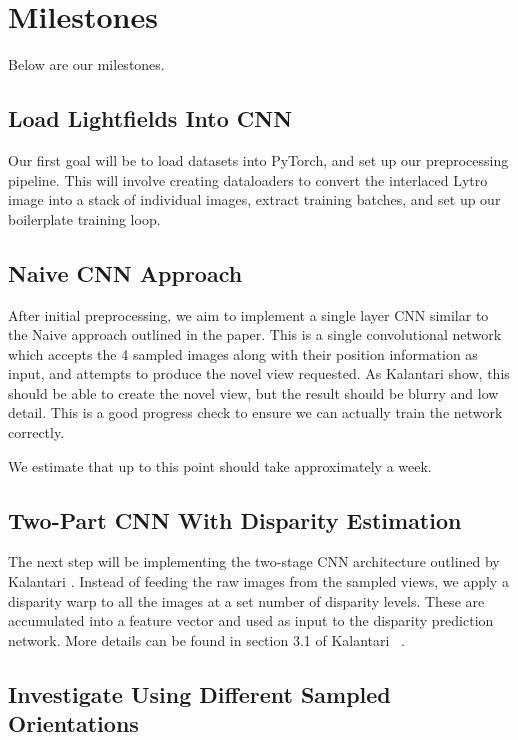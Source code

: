 \documentclass[10pt,twocolumn,letterpaper]{article}
\begin{document}
\section{Milestones}

Below are our milestones.

\subsection{Load Lightfields Into CNN}

Our first goal will be to load datasets into PyTorch, and set up our preprocessing pipeline.
This will involve creating dataloaders to convert the interlaced Lytro image into a stack of individual images,
extract training batches, and set up our boilerplate training loop.

\subsection{Naive CNN Approach}

After initial preprocessing, we aim to implement a single layer CNN similar to the
Naive approach outlined in the paper. This is a single convolutional network which
accepts the 4 sampled images along with their position information as input, and
attempts to produce the novel view requested. As Kalantari \etal show, this should be able
to create the novel view, but the result should be blurry and low detail. This is a good
progress check to ensure we can actually train the network correctly.

We estimate that up to this point should take approximately a week.

\subsection{Two-Part CNN With Disparity Estimation}

The next step will be implementing the two-stage CNN architecture outlined by Kalantari \etal.
Instead of feeding the raw images from the sampled views, we apply a disparity warp to all the
images at a set number of disparity levels. These are accumulated into a feature vector and used as
input to the disparity prediction network. More details can be found in section 3.1 of 
Kalantari \etal~\cite{LearningViewSynthesis}.

\subsection{Investigate Using Different Sampled Orientations}
\end{document}
